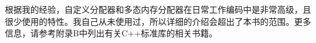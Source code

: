 根据我的经验，自定义分配器和多态内存分配器在日常工作编码中是非常高级，且很少使用的特性。我自己从未使用过，所以详细的介绍会超出了本书的范围。更多信息，请参考附录B中列出有关C++标准库的相关书籍。



















